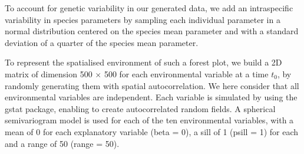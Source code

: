 \documentclass[
]{article}
\begin{document}
To account for genetic variability in our generated data, we add an
intraspecific variability in species parameters by sampling each
individual parameter in a normal distribution centered on the species
mean parameter and with a standard deviation of a quarter of the species
mean parameter.

To represent the spatialised environment of such a forest plot, we build
a 2D matrix of dimension 500 \(\times\) 500 for each environmental
variable at a time \(t_0\), by randomly generating them with spatial
autocorrelation. We here consider that all environmental variables are
independent. Each variable is simulated by using the gstat package,
enabling to create autocorrelated random fields. A spherical
semivariogram model is used for each of the ten environmental variables,
with a mean of 0 for each explanatory variable (beta = 0), a sill of 1
(psill = 1) for each and a range of 50 (range = 50).
\end{document}
